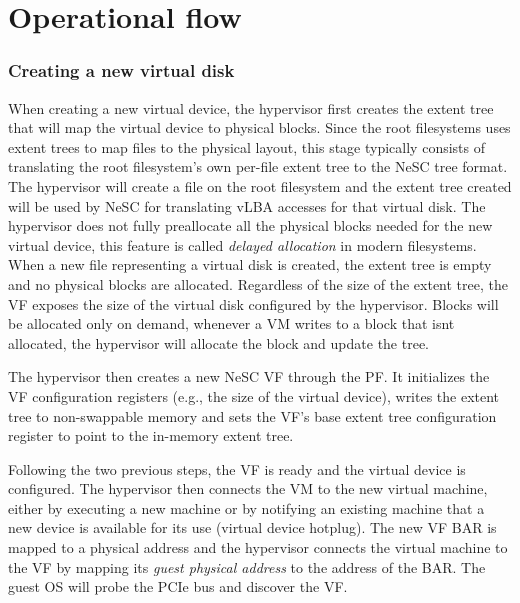 \section{Operational flow}

\subsubsection{Creating a new virtual disk}
When creating a new virtual device, the hypervisor first creates the extent tree that will map the virtual device to physical blocks. Since the root  filesystems uses extent trees to map files to the physical layout, this stage typically consists of translating the root filesystem's own per-file extent tree to the NeSC tree format. The hypervisor will create a file on the root filesystem and the extent tree created will be used by NeSC for translating vLBA accesses for that virtual disk.
%
The hypervisor does not fully preallocate all the physical blocks needed for the new virtual device, this feature is called \emph{delayed allocation} in modern filesystems. When a new file representing a virtual disk is created, the
extent tree is empty and no physical blocks are allocated. Regardless of the size of the extent tree, the VF exposes the size of the virtual disk configured by the hypervisor. Blocks will be allocated only on demand, whenever a VM writes to
a block that isnt allocated, the hypervisor will allocate the block and update the tree.

The hypervisor then creates a new NeSC VF through the PF. It initializes the VF configuration registers (e.g., the size of the virtual device), writes the extent tree to non-swappable memory and sets the VF's base extent tree configuration register to point to the in-memory extent tree.

Following the two previous steps, the VF is ready and the virtual device is configured. The hypervisor then connects the VM to the new virtual machine, either by executing a new machine or by notifying an existing machine that a new device is available for its use (virtual device hotplug).
The new VF BAR is mapped to a physical address and the hypervisor connects the virtual machine to the VF by mapping its \emph{guest physical address} to the address of the BAR.
The guest OS will probe the PCIe bus and discover the VF.


